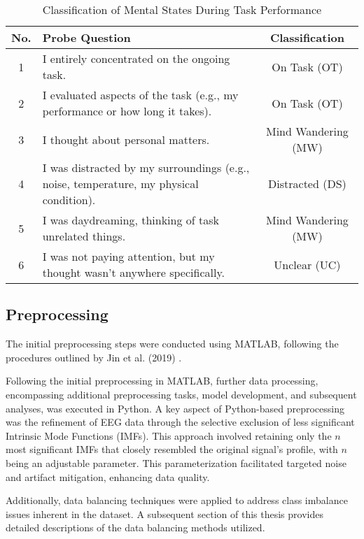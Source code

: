 \begin{table}[h]
\centering
\caption{Classification of Mental States During Task Performance}
\begin{tabular}{|c|p{8cm}|c|}
\hline
\textbf{No.} & \textbf{Probe Question} & \textbf{Classification} \\ \hline
1 & I entirely concentrated on the ongoing task. & On Task (OT) \\ \hline
2 & I evaluated aspects of the task (e.g., my performance or how long it takes). & On Task (OT) \\ \hline
3 & I thought about personal matters. & Mind Wandering (MW) \\ \hline
4 & I was distracted by my surroundings (e.g., noise, temperature, my physical condition). & Distracted (DS) \\ \hline
5 & I was daydreaming, thinking of task unrelated things. & Mind Wandering (MW) \\ \hline
6 & I was not paying attention, but my thought wasn't anywhere specifically. & Unclear (UC) \\ \hline
\end{tabular}
\label{tab:probe}
\end{table}

\subsection{Preprocessing}
The initial preprocessing steps were conducted using MATLAB, following the procedures outlined by Jin et al. (2019) \cite{Jin2019PredictingMW}. 

Following the initial preprocessing in MATLAB, further data processing, encompassing additional preprocessing tasks, model development, and subsequent analyses, was executed in Python. A key aspect of Python-based preprocessing was the refinement of EEG data through the selective exclusion of less significant Intrinsic Mode Functions (IMFs). This approach involved retaining only the \(n\) most significant IMFs that closely resembled the original signal's profile, with \(n\) being an adjustable parameter. This parameterization facilitated targeted noise and artifact mitigation, enhancing data quality.

Additionally, data balancing techniques were applied to address class imbalance issues inherent in the dataset. A subsequent section of this thesis provides detailed descriptions of the data balancing methods utilized.


